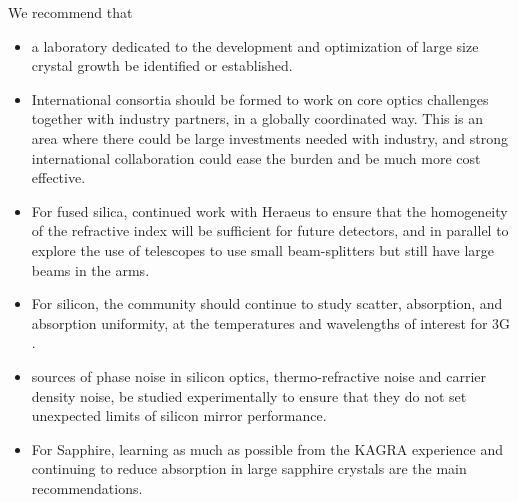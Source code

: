We recommend that
\begin{itemize}
\item a laboratory dedicated to the development and optimization of large size crystal growth be identified or established.
\item International consortia should be formed to work on core optics challenges together with industry
partners, in a globally coordinated way.  This is an area where there could be large investments needed with industry, and strong international collaboration could ease the burden and be much more cost effective.
\item For fused silica, continued work with \acf*{Heraeus} to ensure that the homogeneity of the refractive index will be sufficient for future detectors, and in parallel to explore the use of telescopes to use small beam-splitters but still have large beams in the arms. 
\item For silicon, the community should continue to study scatter, absorption, and absorption uniformity, at the temperatures and wavelengths of interest for \ac{3G} . 
\item sources of phase noise in silicon optics, thermo-refractive noise and carrier density noise, be studied experimentally  to ensure that they do not set unexpected limits of silicon mirror performance. 
\item For Sapphire, learning as much as possible from the \ac{KAGRA} experience and continuing to reduce absorption in large sapphire crystals are the main recommendations. 
\end{itemize}

